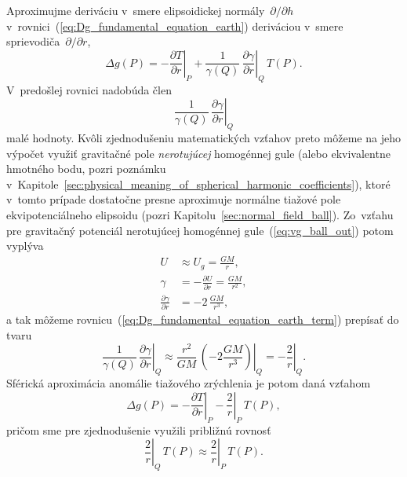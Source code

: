 \documentclass[a4paper, 12pt]{book}
\begin{document}
Aproximujme deriváciu v~smere elipsoidickej normály~$\partial \slash \partial 
h$ v~rovnici~(\ref{eq:Dg_fundamental_equation_earth}) deriváciou v~smere 
sprievodiča~$\partial \slash \partial r$,
%
\begin{equation}
\Delta g(P) = -\left.\frac{\partial T}{\partial r}\right|_{P} 
+ \frac{1}{\gamma(Q)} \, \left.\frac{\partial \gamma}{\partial r}\right|_{Q} \, 
T(P){.}
\end{equation}
%
V~predošlej rovnici nadobúda člen
%
\begin{equation}
\label{eq:Dg_fundamental_equation_earth_term}
\left.\frac{1}{\gamma(Q)} \, \frac{\partial \gamma}{\partial r}\right|_Q
\end{equation}
%
malé hodnoty.  Kvôli zjednodušeniu matematických vzťahov preto môžeme na jeho 
výpočet využiť gravitačné pole \emph{nerotujúcej} homogénnej gule (alebo 
ekvivalentne hmotného bodu, pozri poznámku 
v~Kapitole~\ref{sec:physical_meaning_of_spherical_harmonic_coefficients}), 
ktoré v~tomto prípade dostatočne presne aproximuje normálne tiažové pole 
ekvipotenciálneho elipsoidu (pozri Kapitolu~\ref{sec:normal_field_ball}).  
Zo~vzťahu pre gravitačný potenciál nerotujúcej homogénnej 
gule~(\ref{eq:vg_ball_out}) potom vyplýva
%
\begin{align}
U &\approx U_g = \frac{GM}{r}{,}\\
%
\gamma &= -\frac{\partial U}{\partial r} = \frac{GM}{r^2}{,}\\
%
\frac{\partial \gamma}{\partial r} &= -2 \, \frac{GM}{r^3}{,}
\end{align}
%
a tak môžeme rovnicu~(\ref{eq:Dg_fundamental_equation_earth_term}) prepísať do 
tvaru
%
\begin{equation}
\left.\frac{1}{\gamma(Q)} \, \frac{\partial \gamma}{\partial r}\right|_Q 
\approx \left.\frac{r^2}{GM} \, \left( -2\frac{GM}{r^3} \right)\right|_Q 
= -\left.\frac{2}{r}\right|_Q {.}
\end{equation}
%
Sférická aproximácia anomálie tiažového zrýchlenia je potom daná vzťahom
%
\begin{equation}
\label{eq:Dg_fundamental_equation_earth_sph}
\Delta g(P) = -\left.\frac{\partial T}{\partial r}\right|_{P} 
- \left.\frac{2}{r}\right|_{P} \, T(P){,}
\end{equation}
%
pričom sme pre zjednodušenie využili približnú rovnosť
%
\begin{equation}
\left.\frac{2}{r}\right|_Q \, T(P) \approx \left.\frac{2}{r}\right|_P \, 
T(P){.}
\end{equation}
\end{document}
